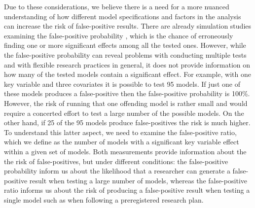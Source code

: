 Due to these considerations, we believe there is a need for a more nuanced understanding of how different model specifications and factors in the analysis can increase the risk of false-positive results. There are already simulation studies examining the false-positive probability \citep{Simmons2011}, which is the chance of erroneously finding one or more significant effects among all the tested ones. However, while the false-positive probability can reveal problems with conducting multiple tests and with flexible research practices in general, it does not provide information on how many of the tested models contain a significant effect. For example, with one key variable and three covariates it is possible to test 95 models. If just one of these models produces a false-positive then the false-positive probability is 100\%. However, the risk of running that one offending model is rather small and would require a concerted effort to test a large number of the possible models. On the other hand, if 25 of the 95 models produce false-positives the risk is much higher. To understand this latter aspect, we need to examine the false-positive ratio, which we define as the number of models with a significant key variable effect within a given set of models. Both measurements provide information about the the risk of false-positives, but under different conditions: the false-positive probability inform us about the likelihood that a researcher can generate a false-positive result when testing a large number of models, whereas the false-positive ratio informs us about the risk of producing a false-positive result when testing a single model such as when following a preregistered research plan. \\

